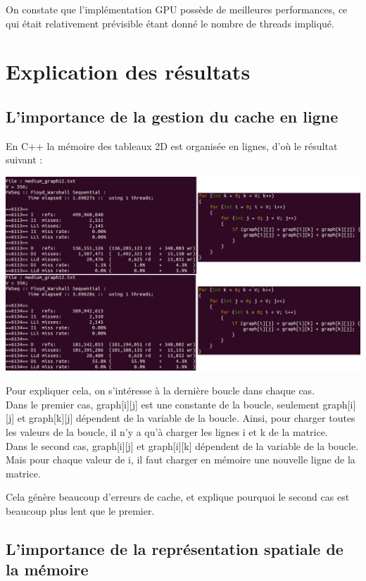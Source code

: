 \documentclass[a4paper,11pt]{article}
\begin{document}
On constate que l'implémentation GPU possède de meilleures performances, ce qui était relativement prévisible étant donné le nombre de threads impliqué.

\section{Explication des résultats}
\subsection{L'importance de la gestion du cache en ligne}

En C++ la mémoire des tableaux 2D est organisée en lignes, d'où le résultat suivant :

\begin{center}
  \includegraphics[scale=0.6]{Cache_Importance.png}
\end{center}

Pour expliquer cela, on s'intéresse à la dernière boucle dans chaque cas.\\

Dans le premier cas, graph[i][j] est une constante de la boucle, seulement graph[i][j] et graph[k][j] dépendent de la variable de la boucle. Ainsi, pour charger toutes les valeurs de la boucle, il n'y a qu'à charger les lignes i et k de la matrice.\\

Dans le second cas, graph[i][j] et graph[i][k] dépendent de la variable de la boucle. Mais pour chaque valeur de i, il faut charger en mémoire une nouvelle ligne de la matrice.

\noindent Cela génère beaucoup d'erreurs de cache, et explique pourquoi le second cas est beaucoup plus lent que le premier.

\subsection{L'importance de la représentation spatiale de la mémoire}
\end{document}
